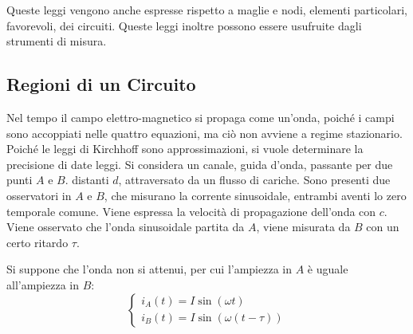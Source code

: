 \documentclass{article}
\numberwithin{equation}{subsection}
\begin{document}
Queste leggi vengono anche espresse rispetto a maglie e nodi, elementi particolari, favorevoli, dei circuiti. Queste leggi inoltre possono essere usufruite dagli strumenti di 
misura. 

\subsection{Regioni di un Circuito}

Nel tempo il campo elettro-magnetico si propaga come un'onda, poiché i campi sono accoppiati nelle quattro equazioni, ma ciò non avviene a regime stazionario. Poiché le leggi di 
Kirchhoff sono approssimazioni, si vuole determinare la precisione di date leggi. Si considera un canale, guida d'onda, passante per due punti $A$ e $B$. distanti $d$, 
attraversato da un flusso di cariche. Sono presenti due osservatori in $A$ e $B$, che misurano la corrente sinusoidale, entrambi aventi lo zero temporale comune. Viene 
espressa la velocità di propagazione dell'onda con $c$. Viene osservato che l'onda sinusoidale partita da $A$, viene misurata da $B$ con un certo ritardo $\tau$. 

\begin{center}
\end{center}


Si suppone che l'onda non si attenui, per cui l'ampiezza in $A$ è uguale all'ampiezza in $B$: 
\begin{equation*}
    \begin{cases}
        i_A(t)=I\sin(\omega t)\\
        i_B(t)=I\sin(\omega(t-\tau))
    \end{cases}
\end{equation*}
\end{document}
